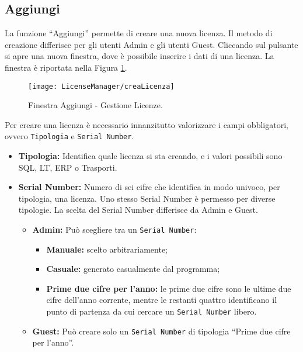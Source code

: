 \subsection{Aggiungi}
La funzione “Aggiungi” permette di creare una nuova licenza. Il metodo di creazione differisce per gli utenti Admin e gli utenti Guest. Cliccando sul pulsante si apre una nuova finestra, dove è possibile inserire i dati di una licenza. La finestra è riportata nella Figura \ref{crealic}.

\begin{figure}[!h] 
    \centering 
    \texttt{[image: LicenseManager/creaLicenza]} 
    \caption{Finestra Aggiungi - Gestione Licenze.}
    \label{crealic}
\end{figure}

Per creare una licenza è necessario innanzitutto valorizzare i campi obbligatori, ovvero \texttt{Tipologia} e \texttt{Serial Number}. 
\begin{itemize}

\item \textbf{Tipologia:} Identifica quale licenza si sta creando, e i valori possibili sono SQL, LT, ERP o Trasporti. 
\item \textbf{Serial Number:} Numero di sei cifre che identifica in modo univoco, per tipologia, una licenza. Uno stesso Serial Number è permesso per diverse tipologie. La scelta del Serial Number differisce da Admin e Guest.  
\begin{itemize}

\item	\textbf{Admin:} Può scegliere tra un \texttt{Serial Number}:
\begin{itemize}
\item \textbf{Manuale:} scelto arbitrariamente;
\item \textbf{Casuale:} generato casualmente dal programma;
\item \textbf{Prime due cifre per l'anno:} le prime due cifre sono le ultime due cifre dell'anno corrente, mentre le restanti quattro identificano il punto di partenza da cui cercare un \texttt{Serial Number} libero.
\end{itemize}
\item	\textbf{Guest:} Può creare solo un \texttt{Serial Number} di tipologia “Prime due cifre per l’anno”.
\end{itemize}

\end{itemize}	

